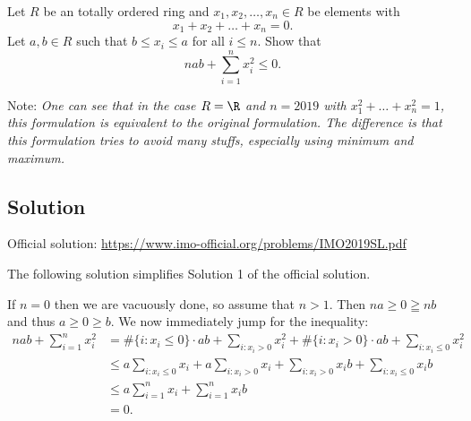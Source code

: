 Let $R$ be an totally ordered ring and $x_1, x_2, \ldots, x_n \in R$ be elements with
\[ x_1 + x_2 + \ldots + x_n = 0. \]
Let $a, b \in R$ such that $b \leq x_i \leq a$ for all $i \leq n$.
Show that
\[ nab + \sum_{i = 1}^n x_i^2 \leq 0. \]

Note: \textit{One can see that in the case $R = \R$ and $n = 2019$ with $x_1^2 + \ldots + x_n^2 = 1$, this formulation is equivalent to the original formulation.
The difference is that this formulation tries to avoid many stuffs, especially using minimum and maximum.}



\subsection*{Solution}

Official solution: \url{https://www.imo-official.org/problems/IMO2019SL.pdf}

The following solution simplifies Solution 1 of the official solution.

If $n = 0$ then we are vacuously done, so assume that $n > 1$.
Then $na \geq 0 \geqq nb$ and thus $a \geq 0 \geq b$.
We now immediately jump for the inequality:
\begin{align*}
    nab + \sum_{i = 1}^n x_i^2
    &= \#\{i : x_i \leq 0\} \cdot ab + \sum_{i : x_i > 0} x_i^2 + \#\{i : x_i > 0\} \cdot ab + \sum_{i : x_i \leq 0} x_i^2 \\
    &\leq a \sum_{i : x_i \leq 0} x_i + a \sum_{i : x_i > 0} x_i + \sum_{i : x_i > 0} x_i b + \sum_{i : x_i \leq 0} x_i b \\
    &\leq a \sum_{i = 1}^n x_i + \sum_{i = 1}^n x_i b \\
    &= 0.
\end{align*}
